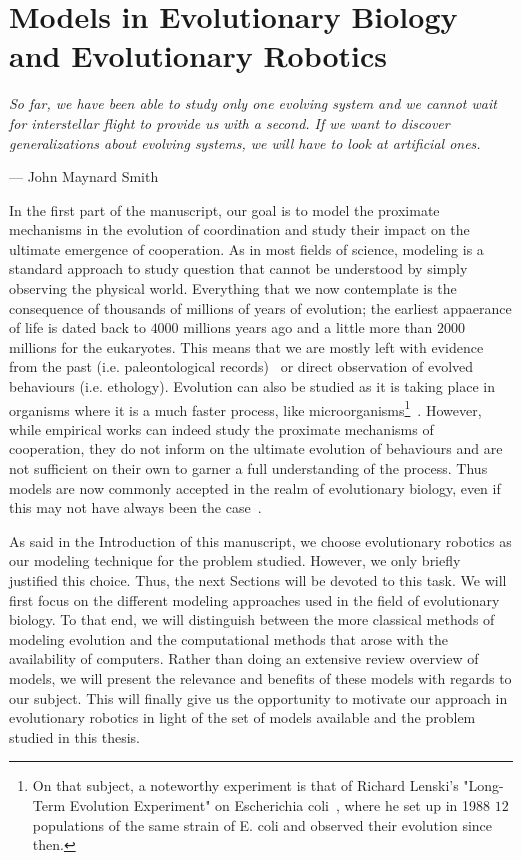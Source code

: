 \chapter{Models in Evolutionary Biology and Evolutionary Robotics}
\label{chapter:model}

\epigraph{\textit{So far, we have been able to study only one evolving system and we cannot wait for interstellar flight to provide us with a second. If we want to discover generalizations about evolving systems, we will have to look at artificial ones.}}{--- \textup{John Maynard Smith}}

\minitoc[n] %

In the first part of the manuscript, our goal is to model the proximate mechanisms in the evolution of coordination and study their impact on the ultimate emergence of cooperation. As in most fields of science, modeling is a standard approach to study question that cannot be understood by simply observing the physical world. Everything that we now contemplate is the consequence of thousands of millions of years of evolution; the earliest appaerance of life is dated back to $4000$ millions years ago and a little more than $2000$ millions for the eukaryotes. This means that we are mostly left with evidence from the past (i.e. paleontological records)~\parencite{Aiello1995, Wrangham1999} or direct observation of evolved behaviours (i.e. ethology). Evolution can also be studied as it is taking place in organisms where it is a much faster process, like microorganisms\footnote{On that subject, a noteworthy experiment is that of Richard Lenski's "Long-Term Evolution Experiment" on Escherichia coli~\parencite{Fox2015}, where he set up in 1988 $12$ populations of the same strain of E. coli and observed their evolution since then.}~\parencite{Elena2003}. However, while empirical works can indeed study the proximate mechanisms of cooperation, they do not inform on the ultimate evolution of behaviours and are not sufficient on their own to garner a full understanding of the process. Thus models are now commonly accepted in the realm of evolutionary biology, even if this may not have always been the case~\parencite{Shou2015}. 

As said in the Introduction of this manuscript, we choose evolutionary robotics as our modeling technique for the problem studied. However, we only briefly justified this choice. Thus, the next Sections will be devoted to this task. We will first focus on the different modeling approaches used in the field of evolutionary biology. To that end, we will distinguish between the more classical methods of modeling evolution and the computational methods that arose with the availability of computers. Rather than doing an extensive review overview of models, we will present the relevance and benefits of these models with regards to our subject. This will finally give us the opportunity to motivate our approach in evolutionary robotics in light of the set of models available and the problem studied in this thesis.


